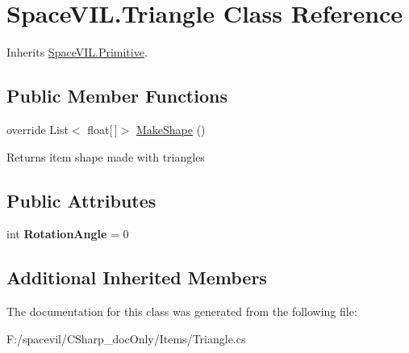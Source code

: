 \hypertarget{class_space_v_i_l_1_1_triangle}{}\section{Space\+V\+I\+L.\+Triangle Class Reference}
\label{class_space_v_i_l_1_1_triangle}


Inherits \mbox{\hyperlink{class_space_v_i_l_1_1_primitive}{Space\+V\+I\+L.\+Primitive}}.

\subsection*{Public Member Functions}
\begin{DoxyCompactItemize}
\item 
\mbox{\label{class_space_v_i_l_1_1_triangle_a454090bb2cb1e8635643fce5ecfd7e7c}} 
override List$<$ float\mbox{[}$\,$\mbox{]}$>$ \mbox{\hyperlink{class_space_v_i_l_1_1_triangle_a454090bb2cb1e8635643fce5ecfd7e7c}{Make\+Shape}} ()
\begin{DoxyCompactList}\small\item\em \begin{DoxyReturn}{Returns}
item shape made with triangles 
\end{DoxyReturn}
\end{DoxyCompactList}\end{DoxyCompactItemize}
\subsection*{Public Attributes}
\begin{DoxyCompactItemize}
\item 
\mbox{\label{class_space_v_i_l_1_1_triangle_a8c1e0b5f117270be3c982cdd7753a911}} 
int {\bfseries Rotation\+Angle} = 0
\end{DoxyCompactItemize}
\subsection*{Additional Inherited Members}


The documentation for this class was generated from the following file\+:\begin{DoxyCompactItemize}
\item 
F\+:/spacevil/\+C\+Sharp\+\_\+doc\+Only/\+Items/Triangle.\+cs\end{DoxyCompactItemize}
